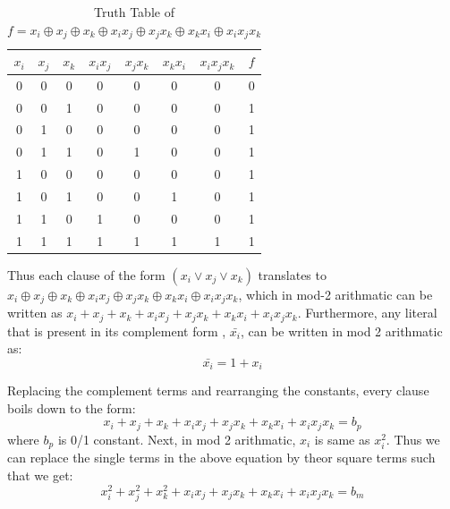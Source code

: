 \documentclass{article}
\begin{document}
\begin{table}[ht]
  \caption{Truth Table of $f = x_{i}\oplus x_{j} \oplus x_{k} \oplus x_{i}x_{j} \oplus x_{j}x_{k} \oplus x_{k}x_{i} \oplus x_{i}x_{j}x_{k}$}
  \centering
  \begin{tabular}{c c c c c c c c}
  \hline\hline
  $x_{i}$ & $x_{j}$ & $x_{k}$ & $x_{i}x_{j}$ & $x_{j}x_{k}$ & $x_{k}x_{i}$ & $x_{i}x_{j}x_{k}$ & $f$ \\[0.5ex]
  \hline
  0 & 0 & 0 & 0 & 0 & 0 & 0 & 0 \\
  0 & 0 & 1 & 0 & 0 & 0 & 0 & 1 \\
  0 & 1 & 0 & 0 & 0 & 0 & 0 & 1 \\
  0 & 1 & 1 & 0 & 1 & 0 & 0 & 1 \\
  1 & 0 & 0 & 0 & 0 & 0 & 0 & 1 \\
  1 & 0 & 1 & 0 & 0 & 1 & 0 & 1 \\
  1 & 1 & 0 & 1 & 0 & 0 & 0 & 1 \\
  1 & 1 & 1 & 1 & 1 & 1 & 1 & 1 \\ [0.5ex]  
  \end{tabular}
  \label{table:nonlin}
  \end{table}	  

  Thus each clause of the form $(x_{i} \vee x_{j} \vee x_{k})$ translates to $x_{i}\oplus x_{j} \oplus x_{k} \oplus x_{i}x_{j} \oplus x_{j}x_{k} \oplus x_{k}x_{i} \oplus x_{i}x_{j}x_{k}$, which in mod-2 arithmatic can be written as $x_{i} + x_{j} + x_{k} + x_{i}x_{j} + x_{j}x_{k} + x_{k}x_{i} + x_{i}x_{j}x_{k}$. \newline
Furthermore, any literal that is present in its complement form , $\bar{x_{i}}$, can be written in mod 2 arithmatic as:
\[ \bar{x_{i}} = 1 + x_{i} \]

Replacing the complement terms and rearranging the constants, every clause boils down to the form: \newline
\[ x_{i} + x_{j} + x_{k} + x_{i}x_{j} + x_{j}x_{k} + x_{k}x_{i} + x_{i}x_{j}x_{k} = b_{p} \]
where $b_{p}$ is 0/1 constant. \newline
Next, in mod 2 arithmatic, $x_{i}$ is same as $x_{i}^2$. Thus we can replace the single terms in the above equation by theor square terms such that we get: \newline
\begin{equation}
 x_{i}^2 + x_{j}^2 + x_{k}^2 + x_{i}x_{j} + x_{j}x_{k} + x_{k}x_{i} + x_{i}x_{j}x_{k} = b_{m} 
\end{equation}
\end{document}
